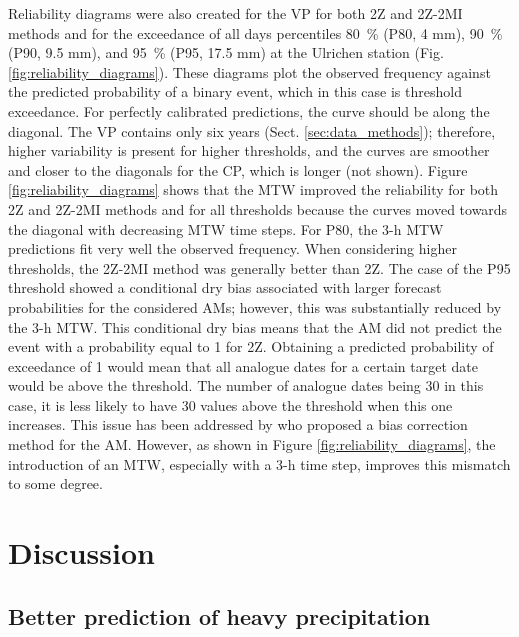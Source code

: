 \documentclass[hess, manuscript]{copernicus}
\begin{document}
	Reliability diagrams were also created for the VP for both 2Z and 2Z-2MI methods and for the exceedance of all days percentiles 80~\% (P80, 4 mm), 90~\% (P90, 9.5 mm), and 95~\% (P95, 17.5 mm) at the Ulrichen station (Fig. \ref{fig:reliability_diagrams}). These diagrams plot the observed frequency against the predicted probability of a binary event, which in this case is threshold exceedance. For perfectly calibrated predictions, the curve should be along the diagonal. The VP contains only six years (Sect. \ref{sec:data_methods}); therefore, higher variability is present for higher thresholds, and the curves are smoother and closer to the diagonals for the CP, which is longer (not shown). Figure \ref{fig:reliability_diagrams} shows that the MTW improved the reliability for both 2Z and 2Z-2MI methods and for all thresholds because the curves moved towards the diagonal with decreasing MTW time steps. For P80, the 3-h MTW predictions fit very well the observed frequency. When considering higher thresholds, the 2Z-2MI method was generally better than 2Z. The case of the P95 threshold showed a conditional dry bias associated with larger forecast probabilities for the considered AMs; however, this was substantially reduced by the 3-h MTW. This conditional dry bias means that the AM did not predict the event with a probability equal to 1 for 2Z. Obtaining a predicted probability of exceedance of 1 would mean that all analogue dates for a certain target date would be above the threshold. The number of analogue dates being 30 in this case, it is less likely to have 30 values above the threshold when this one increases. This issue has been addressed by \cite{Marty2010} who proposed a bias correction method for the AM. However, as shown in Figure \ref{fig:reliability_diagrams}, the introduction of an MTW, especially with a 3-h time step, improves this mismatch to some degree.
	
	
	\section{Discussion}
	\label{sec:discussion}
	
	\subsection{Better prediction of heavy precipitation}
	
\end{document}
